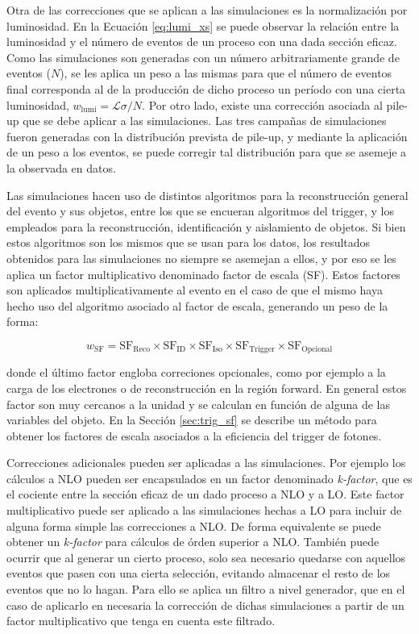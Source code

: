 Otra de las correcciones que se aplican a las simulaciones es la normalización por luminosidad. En la Ecuación \ref{eq:lumi_xs} se puede observar la relación entre la luminosidad y el número de eventos de un proceso con una dada sección eficaz. Como las simulaciones son generadas con un número arbitrariamente grande de eventos ($N$), se les aplica un peso a las mismas para que el número de eventos final corresponda al de la producción de dicho proceso un período con una cierta luminosidad, $w_\text{lumi}=\mathcal{L}\sigma/N$. Por otro lado, existe una corrección asociada al pile-up que se debe aplicar a las simulaciones. Las tres campañas de simulaciones fueron generadas con la distribución prevista de pile-up, y mediante la aplicación de un peso a los eventos, se puede corregir tal distribución para que se asemeje a la observada en datos.

Las simulaciones hacen uso de distintos algoritmos para la reconstrucción general del evento y sus objetos, entre los que se encueran algoritmos del trigger, y los empleados para la reconstrucción, identificación y aislamiento de objetos. Si bien estos algoritmos son los mismos que se usan para los datos, los resultados obtenidos para las simulaciones no siempre se asemejan a ellos, y por eso se les aplica un factor multiplicativo denominado factor de escala (SF). Estos factores son aplicados multiplicativamente al evento en el caso de que el mismo haya hecho uso del algoritmo asociado al factor de escala, generando un peso de la forma: 

\begin{equation}
  w_{\text{SF}} = \text{SF}_\text{Reco} \times \text{SF}_\text{ID} \times  \text{SF}_\text{Iso} \times  \text{SF}_\text{Trigger} \times  \text{SF}_\text{Opcional}
\end{equation}

\noindent
donde el último factor engloba correciones opcionales, como por ejemplo a la carga de los electrones o de reconstrucción en la región forward. En general estos factor son muy cercanos a la unidad y se calculan en función de alguna de las variables del objeto. En la Sección \ref{sec:trig_sf} se describe un método para obtener los factores de escala asociados a la eficiencia del trigger de fotones.

Correcciones adicionales pueden ser aplicadas a las simulaciones. Por ejemplo los cálculos a NLO pueden ser encapsulados en un factor denominado \textit{k-factor}, que es el cociente entre la sección eficaz de un dado proceso a NLO y a LO. Este factor multiplicativo puede ser aplicado a las simulaciones hechas a LO para incluir de alguna forma simple las correcciones a NLO. De forma equivalente se puede obtener un \textit{k-factor} para cálculos de órden superior a NLO. También  puede ocurrir que al generar un cierto proceso, solo sea necesario quedarse con aquellos eventos que pasen con una cierta selección, evitando almacenar el resto de los eventos que no lo hagan. Para ello se aplica un filtro a nivel generador, que en el caso de aplicarlo en necesaria la corrección de dichas simulaciones a partir de un factor multiplicativo que tenga en cuenta este filtrado.

